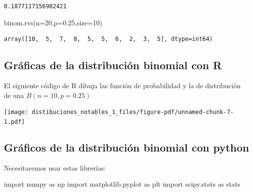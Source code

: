 \documentclass[
  letterpaper,
  DIV=11,
  numbers=noendperiod]{scrreprt}
\newenvironment{Shaded}{\begin{snugshade}}{\end{snugshade}}
\newcommand{\DecValTok}[1]{\textcolor[rgb]{0.68,0.00,0.00}{#1}}
\newcommand{\FloatTok}[1]{\textcolor[rgb]{0.68,0.00,0.00}{#1}}
\newcommand{\ImportTok}[1]{\textcolor[rgb]{0.00,0.46,0.62}{#1}}
\newcommand{\NormalTok}[1]{\textcolor[rgb]{0.00,0.23,0.31}{#1}}
\newcommand{\OperatorTok}[1]{\textcolor[rgb]{0.37,0.37,0.37}{#1}}
\begin{document}
\begin{verbatim}
0.1877117156982421
\end{verbatim}

\begin{Shaded}
\begin{Highlighting}[]
\NormalTok{binom.rvs(n}\OperatorTok{=}\DecValTok{20}\NormalTok{,p}\OperatorTok{=}\FloatTok{0.25}\NormalTok{,size}\OperatorTok{=}\DecValTok{10}\NormalTok{)}
\end{Highlighting}
\end{Shaded}

\begin{verbatim}
array([10,  5,  7,  8,  5,  5,  6,  2,  3,  5], dtype=int64)
\end{verbatim}

\subsection{Gráficas de la distribución binomial con
R}\label{gruxe1ficas-de-la-distribuciuxf3n-binomial-con-r}

El siguiente código de R dibuja las función de probabilidad y la de
distribución de una \(B(n=10,p=0.25)\)

\begin{center}
\texttt{[image: distibuciones\_notables\_1\_files/figure-pdf/unnamed-chunk-7-1.pdf]}
\end{center}

\subsection{Gráficos de la distribución binomial con
python}\label{gruxe1ficos-de-la-distribuciuxf3n-binomial-con-python}

Necesitaremos usar estas librerías:

\begin{Shaded}
\begin{Highlighting}[]
\ImportTok{import}\NormalTok{ numpy }\ImportTok{as}\NormalTok{ np}
\ImportTok{import}\NormalTok{ matplotlib.pyplot }\ImportTok{as}\NormalTok{ plt}
\ImportTok{import}\NormalTok{ scipy.stats }\ImportTok{as}\NormalTok{ stats}
\end{Highlighting}
\end{Shaded}
\end{document}
